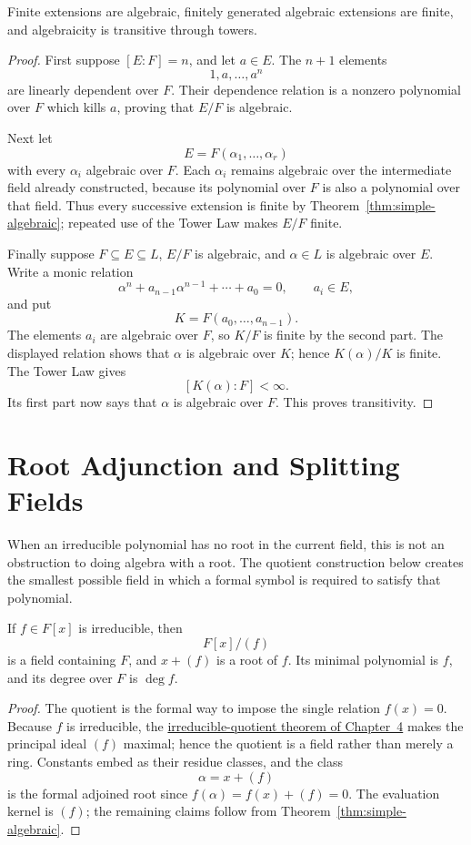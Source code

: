 \begin{proposition}\label{prop:algebraic-towers}
Finite extensions are algebraic, finitely generated algebraic extensions are
finite, and algebraicity is transitive through towers.
\end{proposition}
\begin{proof}
First suppose \([E:F]=n\), and let \(a\in E\).  The \(n+1\) elements
\[
1,a,\ldots,a^n
\]
are linearly dependent over \(F\).  Their dependence relation is a nonzero
polynomial over \(F\) which kills \(a\), proving that \(E/F\) is algebraic.

Next let
\[
E=F(\alpha_1,\ldots,\alpha_r)
\]
with every \(\alpha_i\) algebraic over \(F\).  Each \(\alpha_i\) remains
algebraic over the intermediate field already constructed, because its
polynomial over \(F\) is also a polynomial over that field.  Thus every
successive extension is finite by Theorem~\ref{thm:simple-algebraic}; repeated
use of the Tower Law makes \(E/F\) finite.

Finally suppose \(F\subseteq E\subseteq L\), \(E/F\) is algebraic, and
\(\alpha\in L\) is algebraic over \(E\).  Write a monic relation
\[
\alpha^n+a_{n-1}\alpha^{n-1}+\cdots+a_0=0,
\qquad
a_i\in E,
\]
and put
\[
K=F(a_0,\ldots,a_{n-1}).
\]
The elements \(a_i\) are algebraic over \(F\), so \(K/F\) is finite by the
second part.  The displayed relation shows that \(\alpha\) is algebraic over
\(K\); hence \(K(\alpha)/K\) is finite.  The Tower Law gives
\[
[K(\alpha):F]<\infty.
\]
Its first part now says that \(\alpha\) is algebraic over \(F\).  This proves
transitivity.
\end{proof}

\section{Root Adjunction and Splitting Fields}
When an irreducible polynomial has no root in the current field, this is not
an obstruction to doing algebra with a root.  The quotient construction below
creates the smallest possible field in which a formal symbol is required to
satisfy that polynomial.

\begin{theorem}\label{thm:root-adjunction}
If \(f\in F[x]\) is irreducible, then
\[
F[x]/(f)
\]
is a field containing \(F\), and \(x+(f)\) is a root of \(f\).  Its minimal
polynomial is \(f\), and its degree over \(F\) is \(\deg f\).
\end{theorem}
\begin{proof}
The quotient is the formal way to impose the single relation \(f(x)=0\).
Because \(f\) is irreducible, the
\hyperref[thm:irreducible-maximal-field]{irreducible-quotient theorem of
Chapter~4} makes the principal ideal \((f)\) maximal; hence the quotient is a
field rather than merely a ring.
Constants embed as their residue classes, and the class
\[
\alpha=x+(f)
\]
is the formal adjoined root since \(f(\alpha)=f(x)+(f)=0\).  The evaluation
kernel is \((f)\); the remaining claims follow from
Theorem~\ref{thm:simple-algebraic}.
\end{proof}

